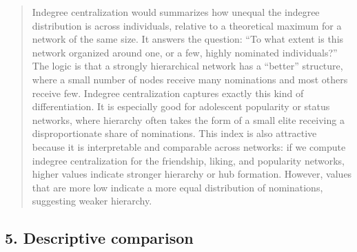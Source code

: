 \documentclass[
  letterpaper,
  DIV=11,
  numbers=noendperiod]{scrartcl}
\begin{document}
\begin{quote}
Indegree centralization would summarizes how unequal the indegree
distribution is across individuals, relative to a theoretical maximum
for a network of the same size. It answers the question: ``To what
extent is this network organized around one, or a few, highly nominated
individuals?'' The logic is that a strongly hierarchical network has a
``better'' structure, where a small number of nodes receive many
nominations and most others receive few. Indegree centralization
captures exactly this kind of differentiation. It is especially good for
adolescent popularity or status networks, where hierarchy often takes
the form of a small elite receiving a disproportionate share of
nominations. This index is also attractive because it is interpretable
and comparable across networks: if we compute indegree centralization
for the friendship, liking, and popularity networks, higher values
indicate stronger hierarchy or hub formation. However, values that are
more low indicate a more equal distribution of nominations, suggesting
weaker hierarchy.
\end{quote}

\subsection{5. Descriptive comparison}\label{descriptive-comparison}
\end{document}
